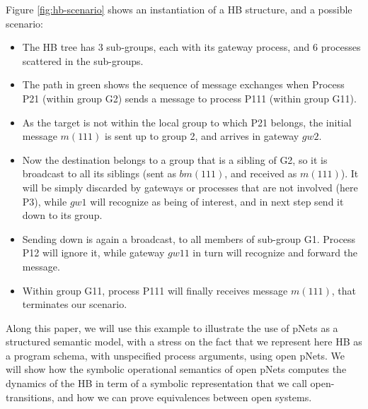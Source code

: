 \documentclass{lncs/llncs}
\begin{document}
Figure \ref{fig:hb-scenario} shows an instantiation of a HB
structure, and a possible scenario:
\begin{itemize}
\item
  The HB tree has 3 sub-groups, each with its gateway process, and 6
  processes scattered in the sub-groups.
\item
  The path in green shows the sequence of message exchanges when Process P21 (within
  group G2) sends a message to process P111 (within group G11).
\item
  As the target is not within the local group to which P21 belongs,
  the initial message $m(111)$ is sent up to group 2, and
  arrives in gateway $gw2$.
\item
  Now the destination belongs to a group that is a sibling of G2, so
  it is broadcast to all its siblings (sent as $bm(111)$, and
  received as $m(111)$). It will be simply discarded by
  gateways or processes that are not involved (here P3), while $gw1$
  will recognize as being of interest, and in next step send it down
  to its group.
\item
  Sending down is again a broadcast, to all members of sub-group
  G1. Process P12 will ignore it, while gateway $gw11$ in turn
  will recognize and forward the message.
\item
  Within group G11, process P111 will finally receives message
  $m(111)$, that terminates our scenario.
\end{itemize}

Along this paper, we will use this example to illustrate the use of
pNets as a structured semantic model, with a stress on the fact that
we represent here HB as a program schema, with unspecified process
arguments, using open pNets. We will show how the symbolic operational
semantics of open pNets computes the dynamics of the HB in term of a
symbolic representation that we call open-transitions, and how we can
prove equivalences between open systems.
\end{document}
